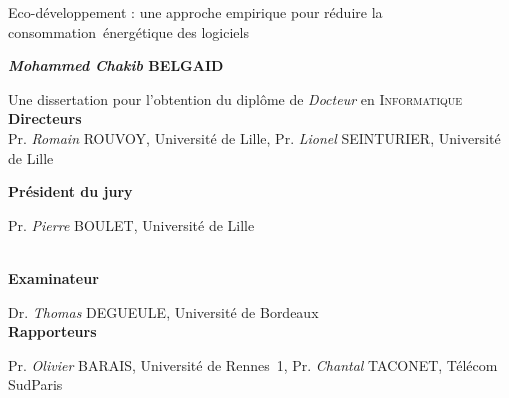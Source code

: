 \begin{center}
    \LARGE
    Eco-développement : une approche empirique pour réduire la consommation~énergétique des logiciels

    \vspace{.8cm}
    \Large
    \textbf{\emph{Mohammed Chakib} \textsc{BELGAID}}
    \vspace{0.8cm}
    \large

    Une dissertation pour l'obtention du diplôme de \emph{Docteur} en \textsc{Informatique}  \\
    \vspace{0.8cm}
    \large
    \textbf{Directeurs}\\
    \RaggedRight
    \vspace{.5cm}
    \normalsize
    Pr. \emph{Romain} \textsc{ROUVOY}, Université de Lille,\newline
    Pr. \emph{Lionel} \textsc{SEINTURIER}, Université de Lille
    \endminipage
    \vspace{0.6cm}

    \large
    \textbf{Président du jury}\\
    \normalsize

    \vspace{.5cm}
    Pr. \emph{Pierre} \textsc{BOULET}, Université de Lille

    \endminipage
    \vspace{.5cm}
    \\
    \large
    \textbf{Examinateur}\\
    \normalsize

    \vspace{.5cm}


    Dr. \emph{Thomas} \textsc{DEGUEULE}, Université de Bordeaux
    \endminipage
    \vspace{.5cm}
    \\
    \large
    \textbf{Rapporteurs}\\

    \vspace{.5cm}
    \normalsize
    Pr. \emph{Olivier} \textsc{BARAIS}, Université de Rennes~1,\newline
    Pr. \emph{Chantal} \textsc{TACONET}, Télécom SudParis


\end{center}

